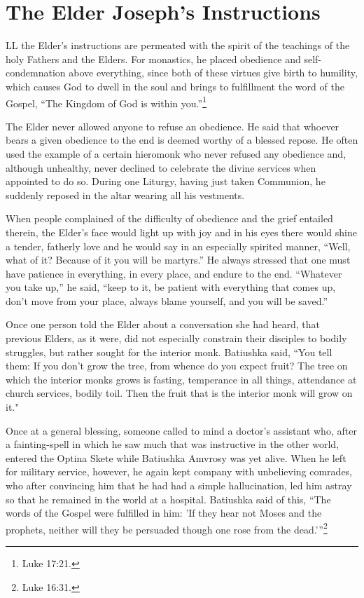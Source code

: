 \chapter {The Elder Joseph's Instructions}
LL the Elder's instructions are permeated with the spirit of the teachings of the holy Fathers and the Elders. For monastics, he placed obedience and self-condemnation above everything, since both of these virtues give birth to humility, which causes God to dwell in the soul and brings to fulfillment the word of the Gospel, “The Kingdom of God is within you.''\footnote{Luke 17:21.}

The Elder never allowed anyone to refuse an obedience. He said that whoever bears a given obedience to the end is deemed worthy of a blessed repose. He often used the example of a certain hieromonk who never refused any obedience and, although unhealthy, never declined to celebrate the divine services when appointed to do so. During one Liturgy, having just taken Communion, he suddenly reposed in the altar wearing all his vestments.

When people complained of the difficulty of obedience and the grief entailed therein, the Elder's face would light up with joy and in his eyes there would shine a tender, fatherly love and he would say in an especially spirited manner, “Well, what of it? Because of it you will be martyrs.” He always stressed that one must have patience in everything, in every place, and endure to the end. “Whatever you take up,” he said, “keep to it, be patient with everything that comes up, don't move from your place, always blame yourself, and you will be saved.”

Once one person told the Elder about a conversation she had heard, that previous Elders, as it were, did not especially constrain their disciples to bodily struggles, but rather sought for the interior monk. Batiushka said, “You tell them: If you don't grow the tree, from whence do you expect fruit? The tree on which the interior monks grows is fasting, temperance in all things, attendance at church services, bodily toil. Then the fruit that is the interior monk will grow on it."

Once at a general blessing, someone called to mind a doctor's assistant who, after a fainting-spell in which he saw much that was instructive in the other world, entered the Optina Skete while Batiushka Amvrosy was yet alive. When he left for military service, however, he again kept company with unbelieving comrades, who after convincing him that he had had a simple hallucination, led him astray so that he remained in the world at a hospital. Batiushka said of this, “The words of the Gospel were fulfilled in him: 'If they hear not Moses and the prophets, neither will they be persuaded though one rose from the dead.'”\footnote{Luke 16:31.}

